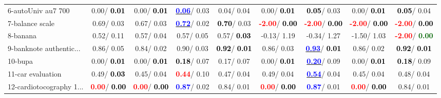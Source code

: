 \begin{table}[h]
\begin{center}
\begin{tabular}{lc|c|c|c|c|c|c|c}
6-autoUniv au7 700 &   0.00/\textcolor{black}{\textbf{  0.01}} &   0.00/\textcolor{black}{\textbf{  0.01}} & \underline{\textcolor{blue}{\textbf{  0.06}}}/  0.03 &   0.04/  0.04 &   0.00/\textcolor{black}{\textbf{  0.01}} & \textcolor{black}{\textbf{  0.05}}/  0.03 &   0.00/\textcolor{black}{\textbf{  0.01}} & \textcolor{black}{\textbf{  0.05}}/  0.04 \\
7-balance scale &   0.69/  0.03 &   0.67/  0.03 & \underline{\textcolor{blue}{\textbf{  0.72}}}/  0.02 & \textcolor{black}{\textbf{  0.70}}/  0.03 & \textcolor{red}{\textbf{ -2.00}}/\textcolor{black}{\textbf{  0.00}} & \textcolor{red}{\textbf{ -2.00}}/\textcolor{black}{\textbf{  0.00}} & \textcolor{red}{\textbf{ -2.00}}/\textcolor{black}{\textbf{  0.00}} & \textcolor{red}{\textbf{ -2.00}}/\textcolor{black}{\textbf{  0.00}} \\ \hline
8-banana &   0.52/  0.11 &   0.57/  0.04 &   0.57/  0.05 &   0.57/\textcolor{black}{\textbf{  0.03}} &  -0.13/  1.19 &  -0.34/  1.27 &  -1.50/  1.03 & \textcolor{red}{\textbf{ -2.00}}/\textcolor{darkgreen}{\textbf{  0.00}} \\
9-banknote authentic... &   0.86/  0.05 &   0.84/  0.02 &   0.90/  0.03 & \textcolor{black}{\textbf{  0.92}}/\textcolor{black}{\textbf{  0.01}} &   0.86/  0.03 & \underline{\textcolor{blue}{\textbf{  0.93}}}/\textcolor{black}{\textbf{  0.01}} &   0.86/  0.02 & \textcolor{black}{\textbf{  0.92}}/\textcolor{black}{\textbf{  0.01}} \\
10-bupa &   0.00/\textcolor{black}{\textbf{  0.01}} &   0.00/\textcolor{black}{\textbf{  0.01}} & \textcolor{black}{\textbf{  0.18}}/  0.07 &   0.17/  0.07 &   0.00/\textcolor{black}{\textbf{  0.01}} & \underline{\textcolor{blue}{\textbf{  0.20}}}/  0.09 &   0.00/\textcolor{black}{\textbf{  0.01}} & \textcolor{black}{\textbf{  0.18}}/  0.09 \\
11-car evaluation &   0.49/\textcolor{black}{\textbf{  0.03}} &   0.45/  0.04 & \textcolor{red}{\textbf{  0.44}}/  0.10 &   0.47/  0.04 &   0.49/  0.04 & \underline{\textcolor{blue}{\textbf{  0.54}}}/  0.04 &   0.45/  0.04 &   0.48/  0.04 \\
12-cardiotocography 1... & \textcolor{red}{\textbf{  0.00}}/\textcolor{black}{\textbf{  0.00}} & \textcolor{red}{\textbf{  0.00}}/\textcolor{black}{\textbf{  0.00}} & \textcolor{blue}{\textbf{  0.87}}/  0.02 &   0.84/  0.01 & \textcolor{red}{\textbf{  0.00}}/\textcolor{black}{\textbf{  0.00}} & \textcolor{blue}{\textbf{  0.87}}/  0.01 & \textcolor{red}{\textbf{  0.00}}/\textcolor{black}{\textbf{  0.00}} &   0.84/  0.01 \\

\end{tabular}
\end{center}
\end{table}
